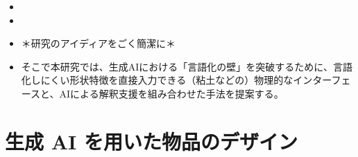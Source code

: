 \documentclass[dvipdfmx]{jlreq}
\begin{document}
\begin{itemize}
  \begin{itemize}
    \item 「創造性の民主化」の推進：高度な造形スキルを持たない人々が、自身の内面にあるイメージを正確に外部化できるよう支援することで、個人の創造的な表現活動を促進する。
    \item 「身体性とデジタル技術の融合」：AIによる自動化が進む現代において、人間が本来持っている「手で考える（触覚的思考）」能力を排除するのではなく、AIによる解釈支援と組み合わせることで、人間の身体的直感とAIの表現力を共存させる新たな創作プロセスを提示する。
  \end{itemize}
  \item 
  \item 
  \item ＊研究のアイディアをごく簡潔に＊
  \item そこで本研究では、生成AIにおける「言語化の壁」を突破するために、言語化しにくい形状特徴を直接入力できる（粘土などの）物理的なインターフェースと、AIによる解釈支援を組み合わせた手法を提案する。
\end{itemize}



\section{生成 AI を用いた物品のデザイン}
\end{document}
